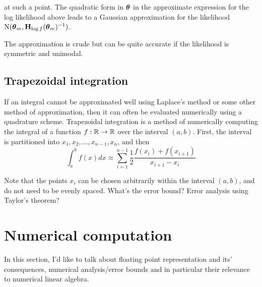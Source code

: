 \documentclass{amsart}[12pt]
\newcommand{\mgc}[1]{{\color{blue}#1}}
\begin{document}
at such a point. The quadratic form in ${\boldsymbol \theta}$ in the approximate expression for the log likelihood above
leads to a Gaussian approximation for the likelihood $\text{N}({\boldsymbol \theta}_m, {\bf H}_{\log f}({\boldsymbol \theta}_m)^{-1})$.

The approximation is crude but can be quite accurate if the likelihood is symmetric and unimodal.

\subsection{Trapezoidal integration}

If an integral cannot be approximated well using Laplace's method or some other method of approximation, then
it can often be evaluated numerically using a quadrature scheme. Trapezoidal integration is a method of
numerically computing the integral of a function $f: {\mathbb{R}} \to {\mathbb{R}}$ over the interval $(a, b)$. First, the
interval is partitioned into $x_1, x_2, \ldots, x_{n-1}, x_n$, and then
\[
	\int_a^b f(x) dx \approx \sum_{i=1}^{n-1} \frac{1}{2} \frac{f(x_i) + f(x_{i+1})}{x_{i+1} - x_i}
\]

Note that the points $x_i$ can be chosen arbitrarily within the interval $(a, b)$, and do not need to be
evenly spaced. \mgc{What's the error bound? Error analysis using Taylor's theorem?}

\section{Numerical computation}

In this section, I'd like to talk about floating point representation and its' consequences, numerical
analysis/error bounds and in particular their relevance to numerical linear algebra.






\end{document}
